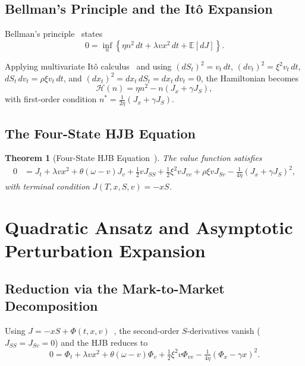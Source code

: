 \documentclass[11pt]{article}
\newtheorem{theorem}{Theorem}[section]
\begin{document}
\subsection{Bellman's Principle and the It\^o Expansion}

Bellman's principle~\cite{fleming2006controlled} states
\[
0 = \inf_n\left\{
\eta n^2\,dt + \lambda v x^2\,dt + \mathbb{E}[dJ]
\right\}.
\]

Applying multivariate It\^o calculus~\cite{karatzas1998brownian} and using
$(dS_t)^2 = v_t\,dt$, $(dv_t)^2 = \xi^2 v_t\,dt$, $dS_t\,dv_t = \rho\xi v_t\,dt$,
and $(dx_t)^2 = dx_t\,dS_t = dx_t\,dv_t = 0$, the Hamiltonian becomes
\[
\mathcal{H}(n) = \eta n^2 - n(J_x + \gamma J_S),
\]
with first-order condition $n^* = \frac{1}{2\eta}(J_x + \gamma J_S)$.

\subsection{The Four-State HJB Equation}

\begin{theorem}[Four-State HJB Equation~\cite{fleming2006controlled}]
The value function satisfies
\[
\boxed{
\begin{aligned}
0
&=
J_t + \lambda vx^2 + \theta(\omega-v)J_v
+ \tfrac12vJ_{SS} + \tfrac12\xi^2vJ_{vv} + \rho\xi vJ_{Sv}
- \tfrac{1}{4\eta}(J_x+\gamma J_S)^2,
\end{aligned}
}
\]
with terminal condition $J(T,x,S,v) = -xS$.
\end{theorem}

\section{Quadratic Ansatz and Asymptotic Perturbation Expansion}

\subsection{Reduction via the Mark-to-Market Decomposition}

Using $J = -xS + \Phi(t,x,v)$~\cite{fouque2011multiscale}, the second-order $S$-derivatives
vanish ($J_{SS} = J_{Sv} = 0$) and the HJB reduces to
\[
0 = \Phi_t + \lambda vx^2 + \theta(\omega-v)\Phi_v + \tfrac12\xi^2v\Phi_{vv}
    - \tfrac{1}{4\eta}(\Phi_x - \gamma x)^2.
\]
\end{document}
